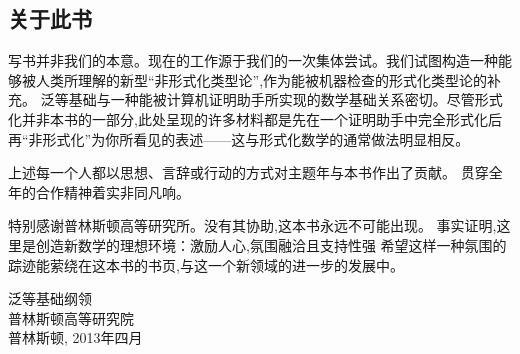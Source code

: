 \subsection*{关于此书}

写书并非我们的本意。现在的工作源于我们的一次集体尝试。我们试图构造一种能够被人类所理解的新型“非形式化类型论”,作为能被机器检查的形式化类型论的补充。
泛等基础与一种能被计算机证明助手所实现的数学基础关系密切。尽管形式化并非本书的一部分,此处呈现的许多材料都是先在一个证明助手中完全形式化后
再“非形式化”为你所看见的表述——这与形式化数学的通常做法明显相反。

上述每一个人都以思想、言辞或行动的方式对主题年与本书作出了贡献。
贯穿全年的合作精神着实非同凡响。

\mentalpause

特别感谢普林斯顿高等研究所。没有其协助,这本书永远不可能出现。
事实证明,这里是创造新数学的理想环境：激励人心,氛围融洽且支持性强
希望这样一种氛围的踪迹能萦绕在这本书的书页,与这一个新领域的进一步的发展中。

\bigskip

\begin{flushright}
泛等基础纲领\\
普林斯顿高等研究院\\
普林斯顿, 2013年四月
\end{flushright}

